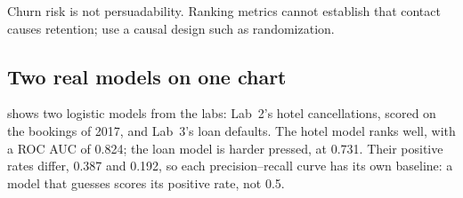 \begin{pitfall}
Churn risk is not persuadability. Ranking metrics cannot establish that contact causes retention; use a causal design such as randomization.
\end{pitfall}

\subsection{Two real models on one chart}

 shows two logistic models from the labs: Lab~2's hotel cancellations, scored on the bookings of 2017, and Lab~3's loan defaults. The hotel model ranks well, with a ROC AUC of 0.824; the loan model is harder pressed, at 0.731. Their positive rates differ, 0.387 and 0.192, so each precision--recall curve has its own baseline: a model that guesses scores its positive rate, not 0.5.

